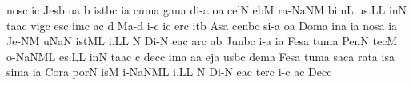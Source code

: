 \spatium
\sgn nos\punctum c\egn
{}i{}\punctum c\egn
\spatium
\sgn Jes\punctum b\egn
\sgn {}u{}\punctum a\egn
\spatium
\custos b
\lineaproxima
{}i{st}\pes bc\egn
\sgn {}i{}\punctum a\egn
\spatium
\sgn cum\punctum a\egn
\spatium
\sgn gau\punctum a\egn
\sgn di-\punctum a\egn
\sgn {}o{}\punctum a\egn
\spatium
\sgn cel\punctum N\egn
\sgn {}eb\punctum M\egn
\sgn ra-\pessubbipunctis NaNM\egn
\sgn bim\punctum L\egn
\sgn {}u{s.}\punctum L\augmentum L\egn
\spatium
\divisiofinalis
\spatium
{}in\punctum N\egn
\sgn ta{}\pes ac\egn
\spatium
\sgn vig\punctum c\egn
\sgn {}es\punctum c\egn
\sgn {}im\punctum c\egn
\sgn {}a{}\punctum c\egn
\spatium
\custos d
\lineaproxima
\sgn Ma-\punctum d\egn
\sgn {}i{-}\punctum c\egn
\sgn {}i{}\punctum c\egn
\spatium
\sgn {}er\punctum c\egn
\sgn {}it\punctum b\egn
\spatium
\sgn {}As\punctum a\egn
\sgn cen\pes bc\egn
\sgn si-\punctum a\egn
\sgn {}o{}\punctum a\egn
\spatium
\sgn Dom\punctum a\egn
\sgn {}in\punctum a\egn
\sgn {}i{}\punctum a\egn
\spatium
\sgn nos\punctum a\egn
{}i{}\punctum a\egn
\spatium
\sgn Je-\clivis NM\egn
{}u{}\torculus NaN\egn
\spatium
{}i{st}\clivis ML\egn
\sgn {}i.\punctum L\augmentum L\egn
\spatium
\divisiofinalis
\spatium
\custos N
\lineaproxima
\sgn Di-\punctum N\egn
\sgn {}e{}\pes ac\egn
\spatium
{}ar\punctum c\egn
{}a{}\punctum b\egn
\spatium
\sgn Jun\pes bc\egn
\sgn {}i-\punctum a\egn
\sgn {}i{}\punctum a\egn
\spatium
\sgn Fes\punctum a\egn
\sgn tum\punctum a\egn
\spatium
\sgn Pen\punctum N\egn
\sgn tec\punctum M\egn
\sgn {}o-\pessubbipunctis NaNM\nonspatium\punctuminclinatum L\egn
{}e{s.}\punctum L\augmentum L\egn
\spatium
\divisiofinalis
\spatium
{}in\punctum N\egn
\sgn ta{}\pes ac\egn
\spatium
\custos c
\lineaproxima
\sgn dec\punctum c\egn
\sgn {}im\punctum a\egn
\sgn {}a{}\punctum a\egn
\spatium
\sgn {}ej\punctum a\egn
\sgn {}us\pes bc\egn
\sgn dem\punctum a\egn
\spatium
\sgn Fes\punctum a\egn
\sgn tum\punctum a\egn
\spatium
\sgn sac\punctum a\egn
\sgn rat\punctum a\egn
\sgn {}is\punctum a\egn
\sgn sim\punctum a\egn
\sgn {}i{}\punctum a\egn
\spatium
\sgn Cor\punctum a\egn
\sgn por\punctum N\egn
\sgn {}is\punctum M\egn
\spatium
{}i-\pessubbipunctis NaNM\nonspatium\punctuminclinatum L\egn
{}i.\punctum L\augmentum L\egn
\spatium
\divisiofinalis
\spatium
\custos N
\lineaproxima
\sgn Di-\punctum N\egn
\sgn {}e{}\pes ac\egn
\spatium
\sgn ter\punctum c\egn
{}i-\punctum c\egn
\sgn {}a{}\punctum c\egn
\spatium
\sgn Dec\punctum c\egn
